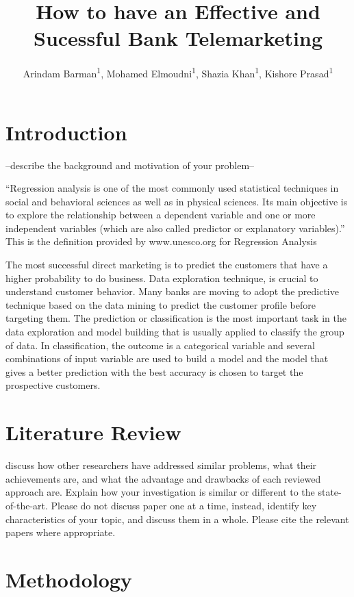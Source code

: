 \documentclass[english,man]{apa6}
\title{How to have an Effective and Sucessful Bank Telemarketing}
\author{
          Arindam Barman\textsuperscript{1},
          Mohamed Elmoudni\textsuperscript{1},
          Shazia Khan\textsuperscript{1},
          Kishore Prasad\textsuperscript{1}  }
\affiliation{
    \vspace{0.5cm}
          \textsuperscript{1} City University of New York (CUNY)  }
\begin{document}
\maketitle



\section{Introduction}\label{introduction}

--describe the background and motivation of your problem--

\enquote{Regression analysis is one of the most commonly used
statistical techniques in social and behavioral sciences as well as in
physical sciences. Its main objective is to explore the relationship
between a dependent variable and one or more independent variables
(which are also called predictor or explanatory variables).} This is the
definition provided by www.unesco.org for Regression Analysis

The most successful direct marketing is to predict the customers that
have a higher probability to do business. Data exploration technique, is
crucial to understand customer behavior. Many banks are moving to adopt
the predictive technique based on the data mining to predict the
customer profile before targeting them. The prediction or classification
is the most important task in the data exploration and model building
that is usually applied to classify the group of data. In
classification, the outcome is a categorical variable and several
combinations of input variable are used to build a model and the model
that gives a better prediction with the best accuracy is chosen to
target the prospective customers.

\section{Literature Review}\label{literature-review}

discuss how other researchers have addressed similar problems, what
their achievements are, and what the advantage and drawbacks of each
reviewed approach are. Explain how your investigation is similar or
different to the state-of-the-art. Please do not discuss paper one at a
time, instead, identify key characteristics of your topic, and discuss
them in a whole. Please cite the relevant papers where appropriate.

\section{Methodology}\label{methodology}
\end{document}
